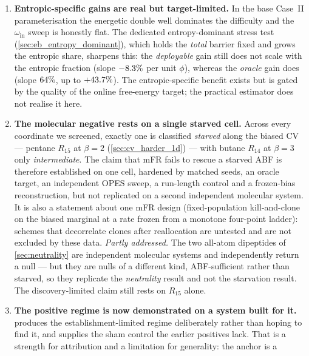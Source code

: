 \begin{enumerate}
        (\cref{rem:manybody}) rather than measured per configuration.
  \item \textbf{Entropic-specific gains are real but target-limited.} In the base
        Case~II parameterisation the energetic double well dominates the difficulty
        and the $\omega_{\mathrm{in}}$ sweep is honestly flat. The dedicated
        entropy-dominant stress test (\cref{sec:eb_entropy_dominant}), which holds
        the \emph{total} barrier fixed and grows the entropic share, sharpens this:
        the \emph{deployable} gain still does not scale with the entropic fraction
        (slope $-8.3\%$ per unit $\phi$), whereas the \emph{oracle} gain
        does (slope $64\%$, up to $+43.7\%$). The
        entropic-specific benefit exists but is gated by the quality of the online
        free-energy target; the practical estimator does not realise it here.
  \item \textbf{The molecular negative rests on a single starved cell.} Across every
        coordinate we screened, exactly one is classified \emph{starved} along the biased
        CV --- pentane $R_{15}$ at $\beta=2$ (\cref{sec:cv_harder_1d}) --- with butane
        $R_{14}$ at $\beta=3$ only \emph{intermediate}. The claim that mFR fails to rescue
        a starved ABF is therefore established on one cell, hardened by matched seeds, an
        oracle target, an independent OPES sweep, a run-length control and a frozen-bias
        reconstruction, but not replicated on a second independent molecular system. It is
        also a statement about one mFR design (fixed-population kill-and-clone on the
        biased marginal at a rate frozen from a monotone four-point ladder): schemes that
        decorrelate clones after reallocation are untested and are not excluded by these
        data. \emph{Partly addressed.} The two all-atom dipeptides of
        \cref{sec:neutrality} are independent molecular systems and independently return a
        null --- but they are nulls of a different kind, ABF-sufficient rather than starved,
        so they replicate the \emph{neutrality} result and not the starvation result. The
        discovery-limited claim still rests on $R_{15}$ alone.
  \item \textbf{The positive regime is now demonstrated on a system built for it.}
         produces the establishment-limited regime deliberately rather
        than hoping to find it, and supplies the sham control the earlier positives lack.
        That is a strength for attribution and a limitation for generality: the anchor is a

\end{enumerate}
